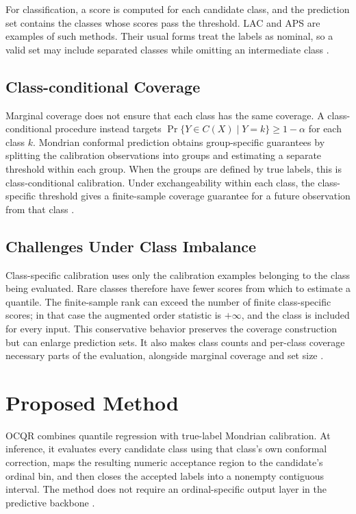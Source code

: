 \documentclass[12pt]{report}
\begin{document}
For classification, a score is computed for each candidate class, and the prediction set contains the classes whose scores pass the threshold. LAC and APS are examples of such methods. Their usual forms treat the labels as nominal, so a valid set may include separated classes while omitting an intermediate class \citep{sadinle2019least,angelopoulos2020uncertainty,romano2020classification}.

\subsection{Class-conditional Coverage}

Marginal coverage does not ensure that each class has the same coverage. A class-conditional procedure instead targets \(\Pr\{Y\in C(X)\mid Y=k\}\geq 1-\alpha\) for each class \(k\). Mondrian conformal prediction obtains group-specific guarantees by splitting the calibration observations into groups and estimating a separate threshold within each group. When the groups are defined by true labels, this is class-conditional calibration. Under exchangeability within each class, the class-specific threshold gives a finite-sample coverage guarantee for a future observation from that class \citep{vovk2005algorithmic,vovk2012conditional}.

\subsection{Challenges Under Class Imbalance}

Class-specific calibration uses only the calibration examples belonging to the class being evaluated. Rare classes therefore have fewer scores from which to estimate a quantile. The finite-sample rank can exceed the number of finite class-specific scores; in that case the augmented order statistic is \(+\infty\), and the class is included for every input. This conservative behavior preserves the coverage construction but can enlarge prediction sets. It also makes class counts and per-class coverage necessary parts of the evaluation, alongside marginal coverage and set size \citep{ding2023classconditional}.

\section{Proposed Method}

OCQR combines quantile regression with true-label Mondrian calibration. At inference, it evaluates every candidate class using that class's own conformal correction, maps the resulting numeric acceptance region to the candidate's ordinal bin, and then closes the accepted labels into a nonempty contiguous interval. The method does not require an ordinal-specific output layer in the predictive backbone \citep{hong2026ocqr}.
\end{document}
